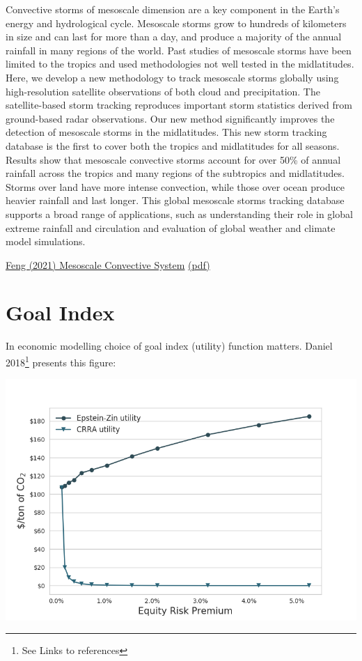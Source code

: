 \documentclass[
]{book}
\begin{document}
Convective storms of mesoscale dimension are a key component
in the Earth's energy and hydrological cycle. Mesoscale storms grow to hundreds of kilometers in size
and can last for more than a day, and produce a majority of the annual rainfall in many regions of the
world. Past studies of mesoscale storms have been limited to the tropics and used methodologies not well
tested in the midlatitudes. Here, we develop a new methodology to track mesoscale storms globally using
high-resolution satellite observations of both cloud and precipitation. The satellite-based storm tracking
reproduces important storm statistics derived from ground-based radar observations. Our new method
significantly improves the detection of mesoscale storms in the midlatitudes. This new storm tracking
database is the first to cover both the tropics and midlatitudes for all seasons. Results show that mesoscale
convective storms account for over 50\% of annual rainfall across the tropics and many regions of the
subtropics and midlatitudes. Storms over land have more intense convection, while those over ocean
produce heavier rainfall and last longer. This global mesoscale storms tracking database supports a broad
range of applications, such as understanding their role in global extreme rainfall and circulation and
evaluation of global weather and climate model simulations.

\href{https://agupubs.onlinelibrary.wiley.com/doi/10.1029/2020JD034202}{Feng (2021) Mesoscale Convective System}
\href{pdf/Feng_2021_Mesoscale_Convective_System.pdf}{(pdf)}

\hypertarget{goal-index}{%
\section{Goal Index}\label{goal-index}}

In economic modelling choice of goal index (utility) function matters.
Daniel 2018\footnote{See Links to references} presents this figure:

\includegraphics{fig/fig_EZvsCRRA_daniel2018fig1.png}
\end{document}
